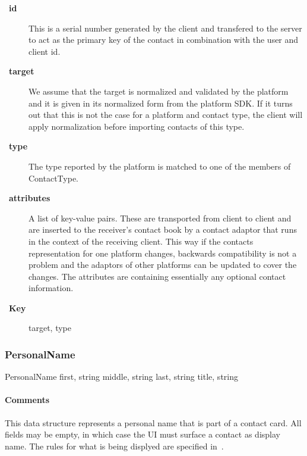 \documentclass[a4paper,10pt,draft]{article}
\let\Item\item
\newcommand\SpecialItem{\renewcommand\item[1][]{\Item[\textbullet~\bfseries##1]}
}
\begin{document}
\SpecialItem
\begin{description}
 \item[id] This is a serial number generated by the client and transfered to the server to act as the primary key of the contact in combination with the user and client id.
 \item[target] We assume that the target is normalized and validated by the platform and it is given in its normalized form from the platform SDK. If it turns out that this is not 
the case for a platform and contact type, the client will apply normalization before importing contacts of this type.
 \item[type] The type reported by the platform is matched to one of the members of ContactType.
 \item[attributes] A list of key-value pairs. These are transported from client to client and are inserted to the receiver's contact book by a contact adaptor that runs in the 
context of the receiving client. This way if the contacts representation for one platform changes, backwards compatibility is not a problem and the adaptors of other platforms can 
be updated to cover the changes. The attributes are containing essentially any optional contact information.
\end{description}

\SpecialItem
\begin{description}
 \item[Key] target, type
\end{description}

\subsubsection{PersonalName}

\begin{verbbox}
PersonalName
{
  first, string
  middle, string
  last, string
  title, string
}
\end{verbbox}
\begin{center}
\theverbbox
\end{center}

\begin{inparaitem}[ ]
 \item \infrastructure
\end{inparaitem}

\paragraph*{Comments}
This data structure represents a personal name that is part of a contact card. All fields may be empty, in which case the UI must surface a contact as display name. The rules 
for what is being displyed are specified in~\cite{flow_spec}.
\end{document}
